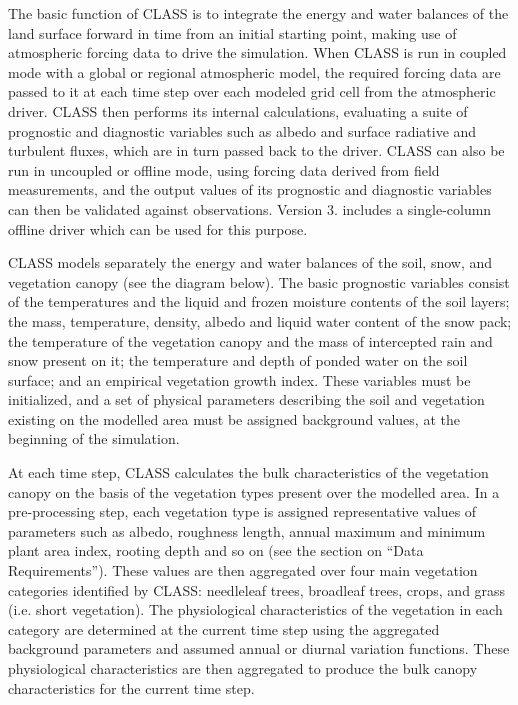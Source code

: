 The basic function of C\+L\+A\+S\+S is to integrate the energy and water balances of the land surface forward in time from an initial starting point, making use of atmospheric forcing data to drive the simulation. When C\+L\+A\+S\+S is run in coupled mode with a global or regional atmospheric model, the required forcing data are passed to it at each time step over each modeled grid cell from the atmospheric driver. C\+L\+A\+S\+S then performs its internal calculations, evaluating a suite of prognostic and diagnostic variables such as albedo and surface radiative and turbulent fluxes, which are in turn passed back to the driver. C\+L\+A\+S\+S can also be run in uncoupled or offline mode, using forcing data derived from field measurements, and the output values of its prognostic and diagnostic variables can then be validated against observations. Version 3. includes a single-\/column offline driver which can be used for this purpose.

C\+L\+A\+S\+S models separately the energy and water balances of the soil, snow, and vegetation canopy (see the diagram below). The basic prognostic variables consist of the temperatures and the liquid and frozen moisture contents of the soil layers; the mass, temperature, density, albedo and liquid water content of the snow pack; the temperature of the vegetation canopy and the mass of intercepted rain and snow present on it; the temperature and depth of ponded water on the soil surface; and an empirical vegetation growth index. These variables must be initialized, and a set of physical parameters describing the soil and vegetation existing on the modelled area must be assigned background values, at the beginning of the simulation.

At each time step, C\+L\+A\+S\+S calculates the bulk characteristics of the vegetation canopy on the basis of the vegetation types present over the modelled area. In a pre-\/processing step, each vegetation type is assigned representative values of parameters such as albedo, roughness length, annual maximum and minimum plant area index, rooting depth and so on (see the section on “\+Data Requirements”). These values are then aggregated over four main vegetation categories identified by C\+L\+A\+S\+S\+: needleleaf trees, broadleaf trees, crops, and grass (i.\+e. short vegetation). The physiological characteristics of the vegetation in each category are determined at the current time step using the aggregated background parameters and assumed annual or diurnal variation functions. These physiological characteristics are then aggregated to produce the bulk canopy characteristics for the current time step.


